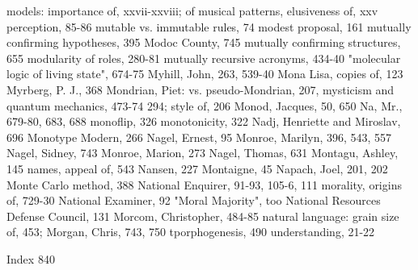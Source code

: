 models: importance of, xxvii-xxviii; of         musical patterns, elusiveness of, xxv
 perception, 85-86                              mutable vs. immutable rules, 74
modest proposal, 161                            mutually confirming hypotheses, 395
Modoc County, 745                               mutually confirming structures, 655
modularity of roles, 280-81                     mutually recursive acronyms, 434-40
"molecular logic of living state", 674-75       Myhill, John, 263, 539-40
Mona Lisa, copies of, 123                       Myrberg, P. J., 368
Mondrian, Piet: vs. pseudo-Mondrian, 207,       mysticism and quantum mechanics, 473-74
294; style of, 206
Monod, Jacques, 50, 650                         Na, Mr., 679-80, 683, 688
monoflip, 326 monotonicity, 322                 Nadj, Henriette and Miroslav, 696
Monotype Modern, 266                            Nagel, Ernest, 95
Monroe, Marilyn, 396, 543, 557                  Nagel, Sidney, 743
Monroe, Marion, 273                             Nagel, Thomas, 631
Montagu, Ashley, 145                            names, appeal of, 543 Nansen, 227
Montaigne, 45                                   Napach, Joel, 201, 202
Monte Carlo method, 388                         National Enquirer, 91-93, 105-6, 111
morality, origins of, 729-30                    National Examiner, 92
"Moral Majority", too                           National Resources Defense Council, 131
Morcom, Christopher, 484-85                     natural language: grain size of, 453;
Morgan, Chris, 743, 750 tporphogenesis, 490      understanding, 21-22

 Index                                                                                    840

